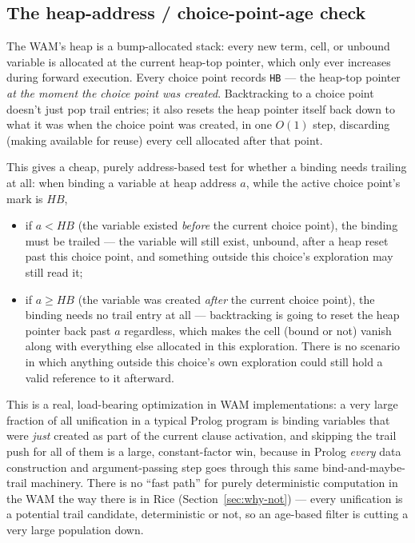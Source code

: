 \documentclass[11pt]{article}
\begin{document}
\subsection{The heap-address / choice-point-age check}

The WAM's heap is a bump-allocated stack: every new term, cell, or unbound
variable is allocated at the current heap-top pointer, which only ever
increases during forward execution. Every choice point records \texttt{HB}
--- the heap-top pointer \emph{at the moment the choice point was created}.
Backtracking to a choice point doesn't just pop trail entries; it also
resets the heap pointer itself back down to what it was when the choice
point was created, in one $O(1)$ step, discarding (making available for
reuse) every cell allocated after that point.

This gives a cheap, purely address-based test for whether a binding needs
trailing at all: when binding a variable at heap address $a$, while the
active choice point's mark is $\mathit{HB}$,

\begin{itemize}
  \item if $a < \mathit{HB}$ (the variable existed \emph{before} the
    current choice point), the binding must be trailed --- the variable
    will still exist, unbound, after a heap reset past this choice point,
    and something outside this choice's exploration may still read it;
  \item if $a \ge \mathit{HB}$ (the variable was created \emph{after} the
    current choice point), the binding needs no trail entry at all ---
    backtracking is going to reset the heap pointer back past $a$
    regardless, which makes the cell (bound or not) vanish along with
    everything else allocated in this exploration. There is no scenario in
    which anything outside this choice's own exploration could still hold
    a valid reference to it afterward.
\end{itemize}

This is a real, load-bearing optimization in WAM implementations: a very
large fraction of all unification in a typical Prolog program is binding
variables that were \emph{just} created as part of the current clause
activation, and skipping the trail push for all of them is a large,
constant-factor win, because in Prolog \emph{every} data construction and
argument-passing step goes through this same bind-and-maybe-trail
machinery. There is no ``fast path'' for purely deterministic computation
in the WAM the way there is in Rice (Section~\ref{sec:why-not}) --- every
unification is a potential trail candidate, deterministic or not, so an
age-based filter is cutting a very large population down.
\end{document}

